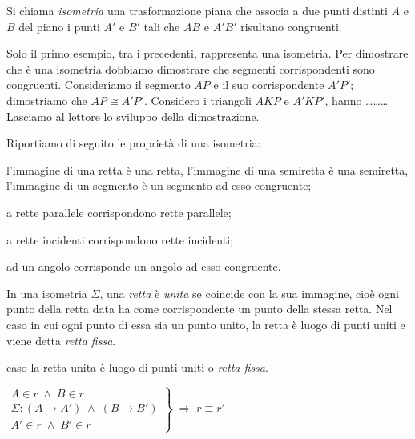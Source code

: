 \begin{definizione}
Si chiama \emph{isometria} una trasformazione piana che associa a due 
punti distinti $A$ e $B$ del piano i punti $A'$ e $B'$ tali che $AB$ 
e $A'B'$ risultano congruenti.
\end{definizione}

Solo il primo esempio, tra i precedenti, rappresenta una isometria. 
Per dimostrare che è una isometria dobbiamo dimostrare che segmenti 
corrispondenti sono congruenti. Consideriamo il segmento $AP$ e il 
suo corrispondente $A'P'$; dimostriamo che $AP\cong A'P'$. Considero 
i triangoli $AKP$ e $A'KP'$, hanno \ldots\ldots\ldots{}
Lasciamo al lettore lo sviluppo della dimostrazione.

Riportiamo di seguito le proprietà di una isometria:
\begin{itemize*}
\item l'immagine di una retta è una retta, l'immagine di una 
semiretta è una semiretta, l'immagine di un segmento è un segmento ad 
esso congruente;
\item a rette parallele corrispondono rette parallele;
\item a rette incidenti corrispondono rette incidenti;
\item ad un angolo corrisponde un angolo ad esso congruente.
\end{itemize*}

\begin{definizione}
In una isometria $\Sigma$, una \emph{retta} è \emph{unita} se 
coincide con la sua immagine, cioè ogni punto della retta data ha 
come corrispondente un punto della stessa retta.
Nel caso in cui ogni punto di essa sia un punto unito, la retta è 
luogo di punti uniti e viene detta \emph{retta fissa}.
\end{definizione}

caso la retta unita è luogo di punti uniti o \emph{retta fissa}.

\noindent\begin{minipage}{0.6\textwidth}\parindent15pt
\noindent $\left.\begin{array}{lll} A\in r \;\wedge\; B\in r\\ \Sigma 
: (A\rightarrow A') \;\wedge\; (B\rightarrow B')\\ A'\in r \;\wedge\; 
B'\in r \end{array}\right\} \;\Rightarrow\; r\equiv r'$
\end{minipage}\hfil
\begin{minipage}{0.4\textwidth}
  \centering
\end{minipage}\vspace{8pt}


